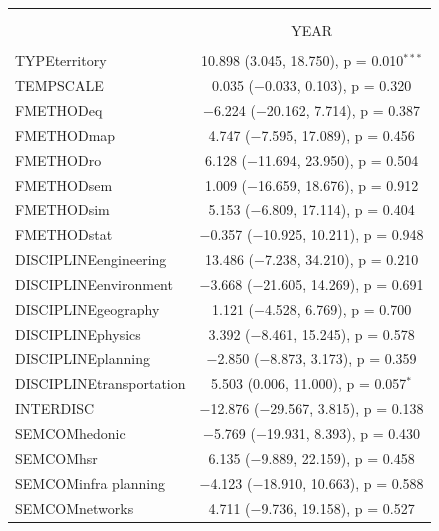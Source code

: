 \begin{table}%
\begin{tabular}{@{\extracolsep{5pt}}lc} 
\footnotesize
\\[-1.8ex]\hline 
\hline \\[-1.8ex] 
\\[-1.8ex] & YEAR \\ 
\hline \\[-1.8ex] 
 TYPEterritory & 10.898 (3.045, 18.750), p = 0.010$^{***}$ \\ 
  TEMPSCALE & 0.035 ($-$0.033, 0.103), p = 0.320 \\ 
  FMETHODeq & $-$6.224 ($-$20.162, 7.714), p = 0.387 \\ 
  FMETHODmap & 4.747 ($-$7.595, 17.089), p = 0.456 \\ 
  FMETHODro & 6.128 ($-$11.694, 23.950), p = 0.504 \\ 
  FMETHODsem & 1.009 ($-$16.659, 18.676), p = 0.912 \\ 
  FMETHODsim & 5.153 ($-$6.809, 17.114), p = 0.404 \\ 
  FMETHODstat & $-$0.357 ($-$10.925, 10.211), p = 0.948 \\ 
  DISCIPLINEengineering & 13.486 ($-$7.238, 34.210), p = 0.210 \\ 
  DISCIPLINEenvironment & $-$3.668 ($-$21.605, 14.269), p = 0.691 \\ 
  DISCIPLINEgeography & 1.121 ($-$4.528, 6.769), p = 0.700 \\ 
  DISCIPLINEphysics & 3.392 ($-$8.461, 15.245), p = 0.578 \\ 
  DISCIPLINEplanning & $-$2.850 ($-$8.873, 3.173), p = 0.359 \\ 
  DISCIPLINEtransportation & 5.503 (0.006, 11.000), p = 0.057$^{*}$ \\ 
  INTERDISC & $-$12.876 ($-$29.567, 3.815), p = 0.138 \\ 
  SEMCOMhedonic & $-$5.769 ($-$19.931, 8.393), p = 0.430 \\ 
  SEMCOMhsr & 6.135 ($-$9.889, 22.159), p = 0.458 \\ 
  SEMCOMinfra planning & $-$4.123 ($-$18.910, 10.663), p = 0.588 \\ 
  SEMCOMnetworks & 4.711 ($-$9.736, 19.158), p = 0.527 \\ 

\end{tabular}
\end{table}
